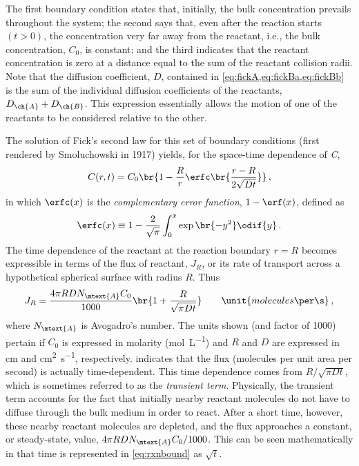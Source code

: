 The first boundary condition states that, initially, the bulk concentration prevails throughout the system; the second says that, even after the reaction starts \( (t > 0) \), the concentration very far away from the reactant, i.e., the bulk concentration, \( C_0 \), is constant; and the third indicates that the reactant concentration is zero at a distance equal to the sum of the reactant collision radii. 
Note that the diffusion coefficient, \( D \), contained in \cref{eq:fickA,eq:fickBa,eq:fickBb} is the sum of the individual diffusion coefficients of the reactants, \( D_{\ch{A}} + D_{\ch{B}} \). 
This expression essentially allows the motion of one of the reactants to be considered relative to the other. 

The solution of Fick's second law for this set of boundary conditions (first rendered by Smoluchowski in 1917) yields, for the space-time dependence of \emph{C},
\begin{equation}
	C(r, t) = C_0 \br{ 1 - \frac{R}{r} \erfc\br{ \frac{r-R}{2 \sqrt{D t} }}} \, , 
\end{equation}
in which \( \erfc(x) \) is the \emph{complementary error function}, \( 1 - \erf(x) \), defined as
\[
	\erfc(x) \equiv 1 - \frac{2}{\sqrt{\pi}}\int_0^x \exp\br{ -y^2 } \odif{y} \, .
\]
The time dependence of the reactant at the reaction boundary \( r = R \) becomes expressible in terms of the flux of reactant, \( J_R \), or its rate of transport across a hypothetical spherical surface with radius \( R \). 
Thus
\begin{equation}
	J_R = \frac{4\pi R D N_\mtext{A} C_0}{1000} \br{ 1 + \frac{R}{\sqrt{\pi D t}}} \qquad \unit{molecules \per \s} \, ,
	\label{eq:rxnbound}
\end{equation}
where \( N_\mtext{A} \) is Avogadro's number. 
The units shown (and factor of 1000) pertain if \( C_0 \) is expressed in molarity (\unit{\mol\per\liter}) and \( R \) and \( D \) are expressed in \unit{\cm} and \unit{\cm\squared \per \s}, respectively.
 indicates that the flux (molecules per unit area per second) is actually time-dependent. 
This time dependence comes from \( R/\sqrt{\pi D t} \), which is sometimes referred to as the \emph{transient term}. 
Physically, the transient term accounts for the fact that initially nearby reactant molecules do not have to diffuse through the bulk medium in order to react. 
After a short time, however, these nearby reactant molecules are depleted, and the flux approaches a constant, or steady-state, value, \( 4\pi R D N_\mtext{A} C_0 / 1000 \). 
This can be seen mathematically in that time is represented in \cref{eq:rxnbound} as \( \sqrt{t} \). 

